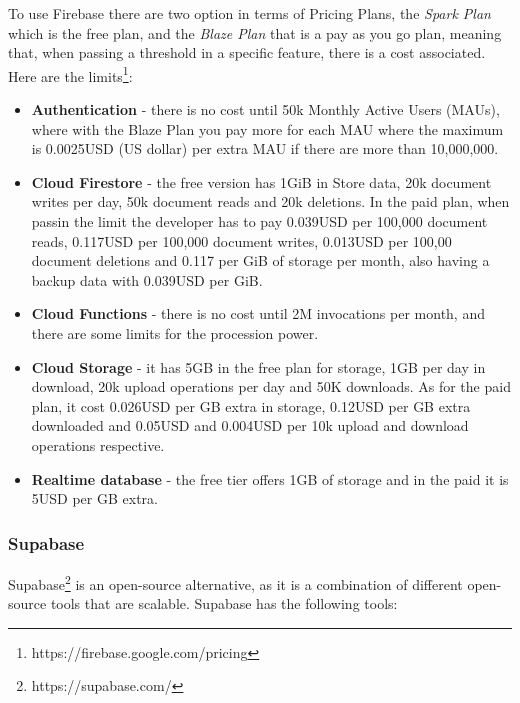 To use Firebase there are two option in terms of Pricing Plans, the \textit{Spark Plan} which is the free plan, and the \textit{Blaze Plan} that is a pay as you go plan, meaning that, when passing a threshold in a specific feature, there is a cost associated.
Here are the limits\footnote{https://firebase.google.com/pricing}:
\begin{itemize}
	\item \textbf{Authentication} - there is no cost until 50k Monthly Active Users (MAUs), where with the Blaze Plan you pay more for each MAU where the maximum is 0.0025USD (US dollar) per extra MAU if there are more than 10,000,000.
	\item \textbf{Cloud Firestore} - the free version has 1GiB in Store data, 20k document writes per day, 50k document reads and 20k deletions. In the paid plan, when passin the limit the developer has to pay 0.039USD per 100,000 document reads, 0.117USD per 100,000 document writes, 0.013USD per 100,00 document deletions and 0.117 per GiB of storage per month, also having a backup data with 0.039USD per GiB.
	\item \textbf{Cloud Functions} - there is no cost until 2M invocations per month, and there are some limits for the procession power.
	\item \textbf{Cloud Storage} - it has 5GB in the free plan for storage, 1GB per day in download, 20k upload operations per day and 50K downloads. As for the paid plan, it cost 0.026USD per GB extra in storage, 0.12USD per GB extra downloaded and 0.05USD and 0.004USD per 10k upload and download operations respective.
	\item \textbf{Realtime database} - the free tier offers 1GB of storage and in the paid it is 5USD per GB extra.
\end{itemize}

\subsubsection{\textbf{Supabase}}

Supabase\footnote{https://supabase.com/} is an open-source alternative, as it is a combination of different open-source tools that are scalable\cite{ZewdieAyezabu2022}. Supabase has the following tools:

